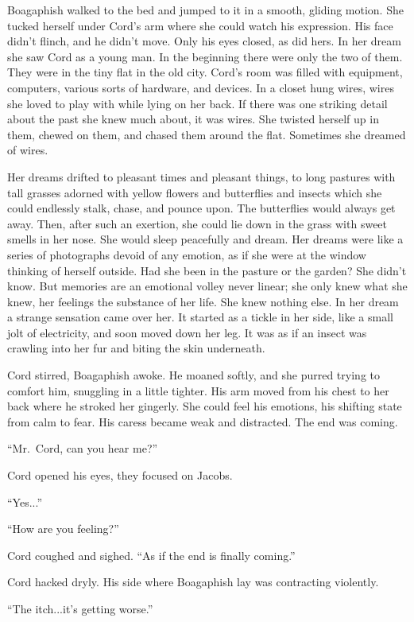\documentclass[
]{article}
\begin{document}
Boagaphish walked to the bed and jumped to it in a smooth, gliding
motion. She tucked herself under Cord's arm where she could watch his
expression. His face didn't flinch, and he didn't move. Only his eyes
closed, as did hers. In her dream she saw Cord as a young man. In the
beginning there were only the two of them. They were in the tiny flat in
the old city. Cord's room was filled with equipment, computers, various
sorts of hardware, and devices. In a closet hung wires, wires she loved
to play with while lying on her back. If there was one striking detail
about the past she knew much about, it was wires. She twisted herself up
in them, chewed on them, and chased them around the flat. Sometimes she
dreamed of wires.

Her dreams drifted to pleasant times and pleasant things, to long
pastures with tall grasses adorned with yellow flowers and butterflies
and insects which she could endlessly stalk, chase, and pounce upon. The
butterflies would always get away. Then, after such an exertion, she
could lie down in the grass with sweet smells in her nose. She would
sleep peacefully and dream. Her dreams were like a series of photographs
devoid of any emotion, as if she were at the window thinking of herself
outside. Had she been in the pasture or the garden? She didn't know. But
memories are an emotional volley never linear; she only knew what she
knew, her feelings the substance of her life. She knew nothing else. In
her dream a strange sensation came over her. It started as a tickle in
her side, like a small jolt of electricity, and soon moved down her leg.
It was as if an insect was crawling into her fur and biting the skin
underneath.

Cord stirred, Boagaphish awoke. He moaned softly, and she purred trying
to comfort him, snuggling in a little tighter. His arm moved from his
chest to her back where he stroked her gingerly. She could feel his
emotions, his shifting state from calm to fear. His caress became weak
and distracted. The end was coming.

``Mr.~Cord, can you hear me?''

Cord opened his eyes, they focused on Jacobs.

``Yes...''

``How are you feeling?''

Cord coughed and sighed. ``As if the end is finally coming.''

Cord hacked dryly. His side where Boagaphish lay was contracting
violently.

``The itch...it's getting worse.''
\end{document}
